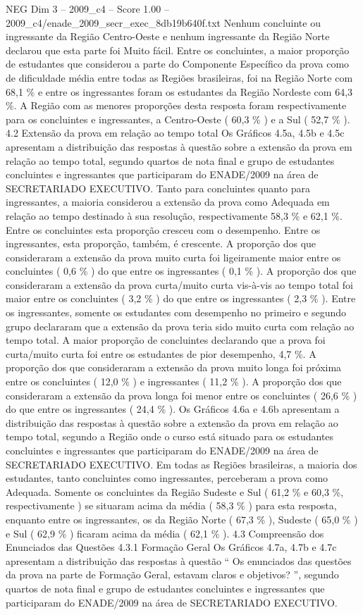 \begin{textsample}{NEG Dim 3 – 2009\_c4 – Score 1.00 – 2009\_c4/enade\_2009\_secr\_exec\_8db19b640f.txt}
Nenhum concluinte ou ingressante da Região Centro-Oeste e nenhum ingressante da Região Norte declarou que esta parte foi Muito fácil.
Entre os concluintes, a maior proporção de estudantes que considerou a parte do Componente Específico da prova como de dificuldade média entre todas as Regiões brasileiras, foi na Região Norte com 68,1 \% e entre os ingressantes foram os estudantes da Região Nordeste com 64,3 \%.
A Região com as menores proporções desta resposta foram respectivamente para os concluintes e ingressantes, a Centro-Oeste ( 60,3 \% ) e a Sul ( 52,7 \% ). 4.2 Extensão da prova em relação ao tempo total Os Gráficos 4.5a, 4.5b e 4.5c apresentam a distribuição das respostas à questão sobre a extensão da prova em relação ao tempo total, segundo quartos de nota final e grupo de estudantes concluintes e ingressantes que participaram do ENADE/2009 na área de SECRETARIADO EXECUTIVO.
Tanto para concluintes quanto para ingressantes, a maioria considerou a extensão da prova como Adequada em relação ao tempo destinado à sua resolução, respectivamente 58,3 \% e 62,1 \%.
Entre os concluintes esta proporção cresceu com o desempenho.
Entre os ingressantes, esta proporção, também, é crescente.
A proporção dos que consideraram a extensão da prova muito curta foi ligeiramente maior entre os concluintes ( 0,6 \% ) do que entre os ingressantes ( 0,1 \% ).
A proporção dos que consideraram a extensão da prova curta/muito curta vis-à-vis ao tempo total foi maior entre os concluintes ( 3,2 \% ) do que entre os ingressantes ( 2,3 \% ).
Entre os ingressantes, somente os estudantes com desempenho no primeiro e segundo grupo declararam que a extensão da prova teria sido muito curta com relação ao tempo total.
A maior proporção de concluintes declarando que a prova foi curta/muito curta foi entre os estudantes de pior desempenho, 4,7 \%.
A proporção dos que consideraram a extensão da prova muito longa foi próxima entre os concluintes ( 12,0 \% ) e ingressantes ( 11,2 \% ).
A proporção dos que consideraram a extensão da prova longa foi menor entre os concluintes ( 26,6 \% ) do que entre os ingressantes ( 24,4 \% ).
Os Gráficos 4.6a e 4.6b apresentam a distribuição das respostas à questão sobre a extensão da prova em relação ao tempo total, segundo a Região onde o curso está situado para os estudantes concluintes e ingressantes que participaram do ENADE/2009 na área de SECRETARIADO EXECUTIVO.
Em todas as Regiões brasileiras, a maioria dos estudantes, tanto concluintes como ingressantes, perceberam a prova como Adequada.
Somente os concluintes da Região Sudeste e Sul ( 61,2 \% e 60,3 \%, respectivamente ) se situaram acima da média ( 58,3 \% ) para esta resposta, enquanto entre os ingressantes, os da Região Norte ( 67,3 \% ), Sudeste ( 65,0 \% ) e Sul ( 62,9 \% ) ficaram acima da média ( 62,1 \% ). 4.3 Compreensão dos Enunciados das Questões 4.3.1 Formação Geral Os Gráficos 4.7a, 4.7b e 4.7c apresentam a distribuição das respostas à questão “ Os enunciados das questões da prova na parte de Formação Geral, estavam claros e objetivos? ”, segundo quartos de nota final e grupo de estudantes concluintes e ingressantes que participaram do ENADE/2009 na área de SECRETARIADO EXECUTIVO.

\end{textsample}
